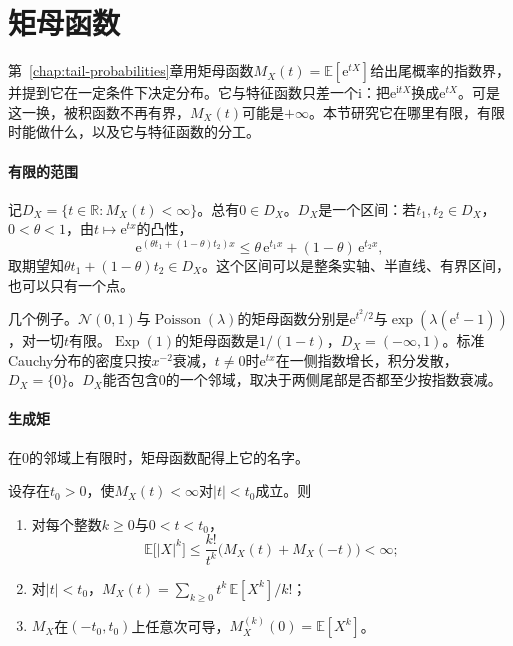 \section{矩母函数}
\label{sec:weak-mgf}

第~\ref{chap:tail-probabilities}章用矩母函数$M_X(t)=\mathbb{E}[\mathrm{e}^{tX}]$给出尾概率的指数界，并提到它在一定条件下决定分布。它与特征函数只差一个$\mathrm{i}$：把$\mathrm{e}^{\mathrm{i}tX}$换成$\mathrm{e}^{tX}$。可是这一换，被积函数不再有界，$M_X(t)$可能是$+\infty$。本节研究它在哪里有限，有限时能做什么，以及它与特征函数的分工。

\paragraph{有限的范围}
记$D_X=\{t\in\mathbb{R}:M_X(t)<\infty\}$。总有$0\in D_X$。$D_X$是一个区间：若$t_1,t_2\in D_X$，$0<\theta<1$，由$t\mapsto\mathrm{e}^{tx}$的凸性，
\[
 \mathrm{e}^{(\theta t_1+(1-\theta)t_2)x}\leq\theta\,\mathrm{e}^{t_1x}+(1-\theta)\,\mathrm{e}^{t_2x} ,
\]
取期望知$\theta t_1+(1-\theta)t_2\in D_X$。这个区间可以是整条实轴、半直线、有界区间，也可以只有一个点。

几个例子。$\mathcal{N}(0,1)$与$\operatorname{Poisson}(\lambda)$的矩母函数分别是$\mathrm{e}^{t^{2}/2}$与$\exp(\lambda(\mathrm{e}^{t}-1))$，对一切$t$有限。$\operatorname{Exp}(1)$的矩母函数是$1/(1-t)$，$D_X=(-\infty,1)$。标准Cauchy分布的密度只按$x^{-2}$衰减，$t\neq0$时$\mathrm{e}^{tx}$在一侧指数增长，积分发散，$D_X=\{0\}$。$D_X$能否包含$0$的一个邻域，取决于两侧尾部是否都至少按指数衰减。

\paragraph{生成矩}
在$0$的邻域上有限时，矩母函数配得上它的名字。

\begin{theorem}[矩母函数与矩]
\label{thm:weak-mgf-moments}
设存在$t_0>0$，使$M_X(t)<\infty$对$\lvert t\rvert<t_0$成立。则
\begin{enumerate}
 \item 对每个整数$k\geq0$与$0<t<t_0$，
 \begin{equation}
 \mathbb{E}\bigl[\lvert X\rvert^{k}\bigr]\leq\frac{k!}{t^{k}}\bigl(M_X(t)+M_X(-t)\bigr)<\infty ;
 \label{eq:weak-mgf-moment-bound}
 \end{equation}
 \item 对$\lvert t\rvert<t_0$，$M_X(t)=\sum_{k\geq0}t^{k}\,\mathbb{E}[X^{k}]/k!$；
 \item $M_X$在$(-t_0,t_0)$上任意次可导，$M_X^{(k)}(0)=\mathbb{E}[X^{k}]$。
\end{enumerate}
\end{theorem}


